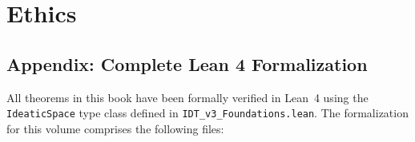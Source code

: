 \documentclass[11pt,oneside]{book}
\theoremstyle{plain}
\theoremstyle{definition}
\theoremstyle{remark}
\begin{document}
\part{Ethics}




\chapter*{Appendix: Complete Lean 4 Formalization}

All theorems in this book have been formally verified in Lean~4 using the
\texttt{IdeaticSpace} type class defined in \texttt{IDT\_v3\_Foundations.lean}.
The formalization for this volume comprises the following files:
\end{document}

